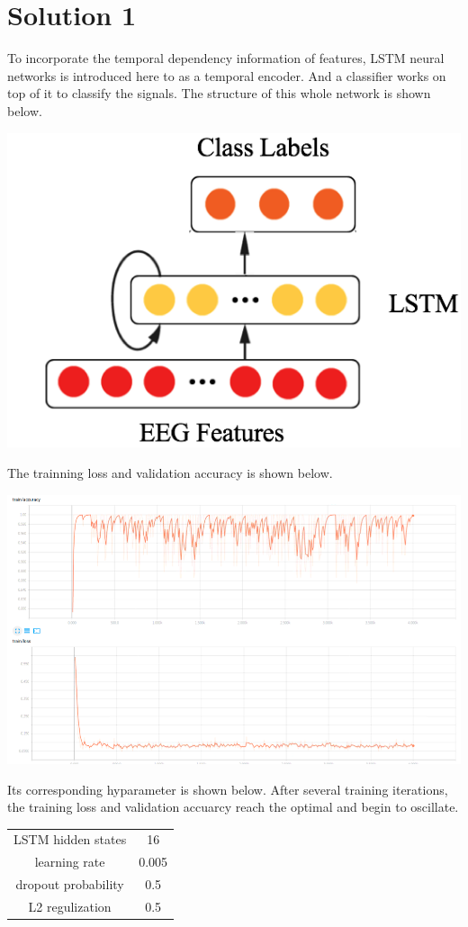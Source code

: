 \documentclass[12pt]{article}
\begin{document}
\section{Solution 1}
To incorporate the temporal dependency information of features, LSTM neural networks is introduced here to as a temporal encoder. And a classifier works on top of it to classify the signals. The structure of this whole network is shown below.
\begin{center}
  \includegraphics[angle = 0, width = .5\textwidth]{./../src/LSTMnet.png}
\end{center}
The trainning loss and validation accuracy is shown below. 
\begin{center}
  \includegraphics[angle = 0, width = .9\textwidth]{./../src/loss_accuracy.png}
\end{center}
Its corresponding hyparameter is shown below. After several training iterations, the training loss and validation accuarcy reach the optimal and begin to oscillate.\\

\begin{center}
	\begin{tabular}{|c|c|}
	LSTM hidden states & 16\\
	learning rate & 0.005\\
	dropout probability & 0.5\\
	L2 regulization & 0.5\\
	\end{tabular}
\end{center}
\end{document}

